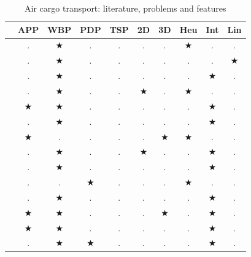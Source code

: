 \documentclass[preprint,authoryear]{elsarticle}
\begin{document}
\begin{table}[H]
	\centering
	\caption{Air cargo transport: literature, problems and features}  \label{tab:sa}
	\scriptsize
	\renewcommand{\arraystretch}{1.1} %
	\begin{tabular}{r|cc|cc|cc|ccc}
		\toprule
		                            & {\bf APP}  & {\bf WBP}  &  {\bf PDP}   &{\bf TSP}   & {\bf 2D}  & {\bf 3D}  & {\bf Heu}  & {\bf Int}  & {\bf Lin} \\
		\midrule
		\cite{LarsenMikkelsen1979}  & $.$        & $\bigstar$ & $.$          & $.$        & $.$       & $.$       & $\bigstar$ & $.$        &  $.$ \\
		\cite{Brosh1981}  & $.$ & $\bigstar$  & $.$   & $.$ & $.$ & $.$   & $.$  & $.$  &  $\bigstar$ \\
		\cite{Kevin1992}  & $.$ & $\bigstar$  & $.$ & $.$ & $.$ &$.$   & $.$  & $\bigstar$  &  $.$ \\
		\cite{Heidelberg1998}  & $.$ & $\bigstar$  & $.$ & $.$ & $\bigstar$ &$.$   & $\bigstar$  & $.$  &  $.$ \\
		\cite{MongeauBes2003}    & $\bigstar$ & $\bigstar$   & $.$ & $.$ & $.$ & $.$   & $.$  & $\bigstar$  &  $.$ \\
		\cite{fok2004optimizing} & $.$ & $\bigstar$   & $.$ & $.$ & $.$ & $.$   & $.$  & $\bigstar$  &  $.$ \\	
		\cite{Chan2006}  & $\bigstar$ & $.$    & $.$ & $.$ & $.$ & $\bigstar$  & $\bigstar$  & $.$  &  $.$ \\
		\cite{KaluznyBohdanL2009Oalb}  & $.$ & $\bigstar$  & $.$  & $.$ & $\bigstar$ &$.$  & $.$  & $\bigstar$  &  $.$ \\
		\cite{Verstichel2011}   & $.$ & $\bigstar$    & $.$ & $.$ & $.$ & $.$   & $.$  & $\bigstar$  &  $.$ \\
		\cite{MesquitaCunha2011}   & $.$ & $.$    & $\bigstar$ & $.$ & $.$ & $.$   & $\bigstar$  & $.$  &  $.$ \\		
		\cite{Limbourg2012} & $.$ & $\bigstar$  & $.$ & $.$ & $.$ & $.$   & $.$  & $\bigstar$  &  $.$ \\
		\cite{RoesenerHall2014}  & $\bigstar$ & $\bigstar$  & $.$  & $.$ & $.$ & $\bigstar$   & $.$  & $\bigstar$  &  $.$ \\
		\cite{Vancroonemburg2014}  & $\bigstar$ & $\bigstar$   & $.$ & $.$ & $.$ & $.$   & $.$  & $\bigstar$  &  $.$ \\
		\cite{LurkinSchyns2015} & $.$ & $\bigstar$  & $\bigstar$ & $.$  & $.$ & $.$   & $.$  & $\bigstar$  &  $.$ \\

\end{tabular}
\end{table}
\end{document}
